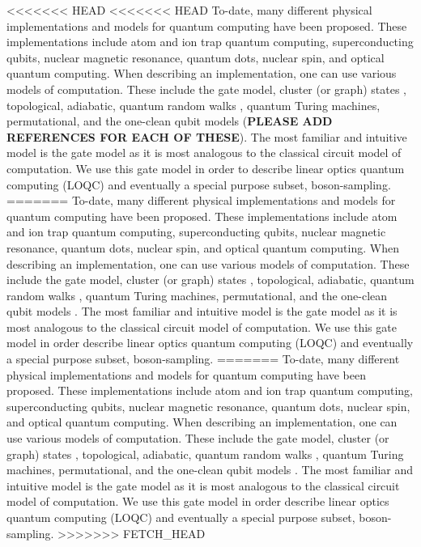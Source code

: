 \documentclass[aps,pra,twocolumn,amsmath,amssymb,nofootinbib,superscriptaddress]{revtex4}
\begin{document}
<<<<<<< HEAD
<<<<<<< HEAD
To-date, many different physical implementations and models for quantum computing have been proposed. These implementations include atom and ion trap quantum computing, superconducting qubits, nuclear magnetic resonance, quantum dots, nuclear spin, and optical quantum computing. When describing an implementation, one can use various models of computation. These include the gate model, cluster (or graph) states \cite{bib:Raussendorf01, bib:Raussendorf03}, topological, adiabatic, quantum random walks \cite{bib:ADZ}, quantum Turing machines, permutational, and the one-clean qubit models (\textbf{PLEASE ADD REFERENCES FOR EACH OF THESE}). The most familiar and intuitive model is the gate model as it is most analogous to the classical circuit model of computation. We use this gate model in order to describe linear optics quantum computing (LOQC) and eventually a special purpose subset, boson-sampling.
=======
To-date, many different physical implementations and models for quantum computing have been proposed. These implementations include atom and ion trap quantum computing, superconducting qubits, nuclear magnetic resonance, quantum dots, nuclear spin, and optical quantum computing. When describing an implementation, one can use various models of computation. These include the gate model, cluster (or graph) states \cite{bib:Raussendorf01, bib:Raussendorf03}, topological, adiabatic, quantum random walks \cite{bib:ADZ}, quantum Turing machines, permutational, and the one-clean qubit models \cite{jordan}. The most familiar and intuitive model is the gate model as it is most analogous to the classical circuit model of computation. We use this gate model in order describe linear optics quantum computing (LOQC) and eventually a special purpose subset, boson-sampling.
=======
To-date, many different physical implementations and models for quantum computing have been proposed. These implementations include atom and ion trap quantum computing, superconducting qubits, nuclear magnetic resonance, quantum dots, nuclear spin, and optical quantum computing. When describing an implementation, one can use various models of computation. These include the gate model, cluster (or graph) states \cite{bib:Raussendorf01, bib:Raussendorf03}, topological, adiabatic, quantum random walks \cite{bib:ADZ}, quantum Turing machines, permutational, and the one-clean qubit models \cite{jordan}. The most familiar and intuitive model is the gate model as it is most analogous to the classical circuit model of computation. We use this gate model in order describe linear optics quantum computing (LOQC) and eventually a special purpose subset, boson-sampling.
>>>>>>> FETCH_HEAD
\end{document}
